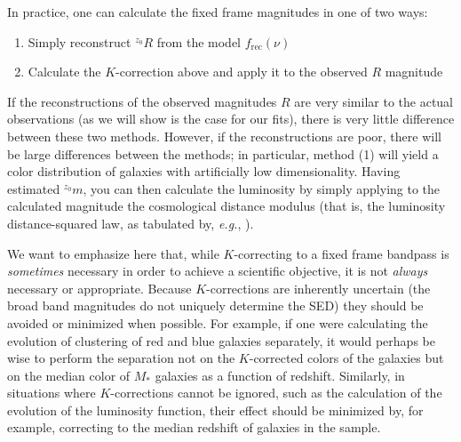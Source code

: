 \documentclass[10pt,preprint]{aastex}
\newcommand{\band}[2]{\ensuremath{^{{#1}}\!{#2}}}
\begin{document}

In practice, one can calculate the fixed frame magnitudes in one of
two ways:
\begin{enumerate}
\item Simply reconstruct $\band{z_0}{R}$ from the model
$f_{\mathrm{rec}}(\nu)$ 
\item Calculate the $K$-correction above and apply it to the observed
$R$ magnitude
\end{enumerate}
If the reconstructions of the observed magnitudes $R$ are very similar
to the actual observations (as we will show is the case for our fits),
there is very little difference between these two methods. However, if
the reconstructions are poor, there will be large differences between
the methods; in particular, method (1) will yield a color distribution
of galaxies with artificially low dimensionality. Having estimated
$\band{z_0}{m}$, you can then calculate the luminosity by simply
applying to the calculated magnitude the cosmological distance modulus
(that is, the luminosity distance-squared law, as tabulated by, {\it
e.g.}, \citealt{hogg99a}).

We want to emphasize here that, while $K$-correcting to a fixed frame
bandpass is {\it sometimes} necessary in order to achieve a scientific
objective, it is not {\it always} necessary or appropriate. Because
$K$-corrections are inherently uncertain (the broad band magnitudes
do not uniquely determine the SED) they should be avoided or
minimized when possible. For example, if one were calculating the
evolution of clustering of red and blue galaxies separately, it would
perhaps be wise to perform the separation not on the $K$-corrected
colors of the galaxies but on the median color of $M_\ast$
galaxies as a function of redshift. Similarly, in situations where
$K$-corrections cannot be ignored, such as the calculation of the
evolution of the luminosity function, their effect should be minimized
by, for example, correcting to the median redshift of galaxies in the
sample.
\end{document}

